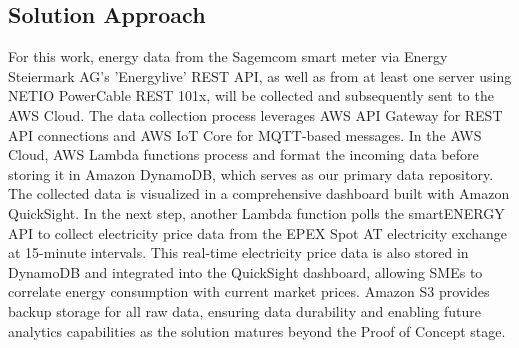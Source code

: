 \subsection{Solution Approach}
For this work, energy data from the Sagemcom smart meter via Energy Steiermark AG's 'Energylive' REST API, as well as from at least one server using NETIO PowerCable REST 101x, will be collected and subsequently sent to the AWS Cloud.
The data collection process leverages AWS API Gateway for REST API connections and AWS IoT Core for MQTT-based messages. 
In the AWS Cloud, AWS Lambda functions process and format the incoming data before storing it in Amazon DynamoDB, which serves as our primary data repository. 
The collected data is visualized in a comprehensive dashboard built with Amazon QuickSight. In the next step, another Lambda function polls the smartENERGY API to collect electricity price data from the EPEX Spot AT electricity exchange at 15-minute intervals. 
This real-time electricity price data is also stored in DynamoDB and integrated into the QuickSight dashboard, allowing SMEs to correlate energy consumption with current market prices. 
Amazon S3 provides backup storage for all raw data, ensuring data durability and enabling future analytics capabilities as the solution matures beyond the Proof of Concept stage.